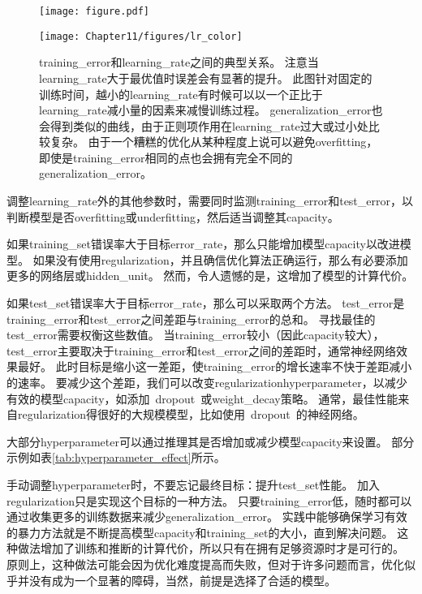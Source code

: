 \begin{figure}[!htb]
\ifOpenSource
\centerline{\texttt{[image: figure.pdf]}}
\else
\centerline{\texttt{[image: Chapter11/figures/lr\_color]}}
\fi
\caption{\gls{training_error}和\gls{learning_rate}之间的典型关系。
注意当\gls{learning_rate}大于最优值时误差会有显著的提升。
此图针对固定的训练时间，越小的\gls{learning_rate}有时候可以以一个正比于\gls{learning_rate}减小量的因素来减慢训练过程。
\gls{generalization_error}也会得到类似的曲线，由于正则项作用在\gls{learning_rate}过大或过小处比较复杂。
由于一个糟糕的优化从某种程度上说可以避免\gls{overfitting}，即使是\gls{training_error}相同的点也会拥有完全不同的\gls{generalization_error}。}
\label{fig:chap11_lr}
\end{figure}

调整\gls{learning_rate}外的其他参数时，需要同时监测\gls{training_error}和\gls{test_error}，以判断模型是否\gls{overfitting}或\gls{underfitting}，然后适当调整其\gls{capacity}。


如果\gls{training_set}错误率大于目标\gls{error_rate}，那么只能增加模型\gls{capacity}以改进模型。
如果没有使用\gls{regularization}，并且确信优化算法正确运行，那么有必要添加更多的网络层或\gls{hidden_unit}。
然而，令人遗憾的是，这增加了模型的计算代价。


如果\gls{test_set}错误率大于目标\gls{error_rate}，那么可以采取两个方法。
\gls{test_error}是\gls{training_error}和\gls{test_error}之间差距与\gls{training_error}的总和。
寻找最佳的\gls{test_error}需要权衡这些数值。
当\gls{training_error}较小（因此\gls{capacity}较大），\gls{test_error}主要取决于\gls{training_error}和\gls{test_error}之间的差距时，通常神经网络效果最好。
此时目标是缩小这一差距，使\gls{training_error}的增长速率不快于差距减小的速率。
要减少这个差距，我们可以改变\gls{regularization}\gls{hyperparameter}，以减少有效的模型\gls{capacity}，如添加~\gls{dropout}~或\gls{weight_decay}策略。
通常，最佳性能来自\gls{regularization}得很好的大规模模型，比如使用~\gls{dropout}~的神经网络。


大部分\gls{hyperparameter}可以通过推理其是否增加或减少模型\gls{capacity}来设置。
部分示例如表\ref{tab:hyperparameter_effect}所示。


手动调整\gls{hyperparameter}时，不要忘记最终目标：提升\gls{test_set}性能。
加入\gls{regularization}只是实现这个目标的一种方法。
只要\gls{training_error}低，随时都可以通过收集更多的训练数据来减少\gls{generalization_error}。
实践中能够确保学习有效的暴力方法就是不断提高模型\gls{capacity}和\gls{training_set}的大小，直到解决问题。
这种做法增加了训练和推断的计算代价，所以只有在拥有足够资源时才是可行的。
原则上，这种做法可能会因为优化难度提高而失败，但对于许多问题而言，优化似乎并没有成为一个显著的障碍，当然，前提是选择了合适的模型。


